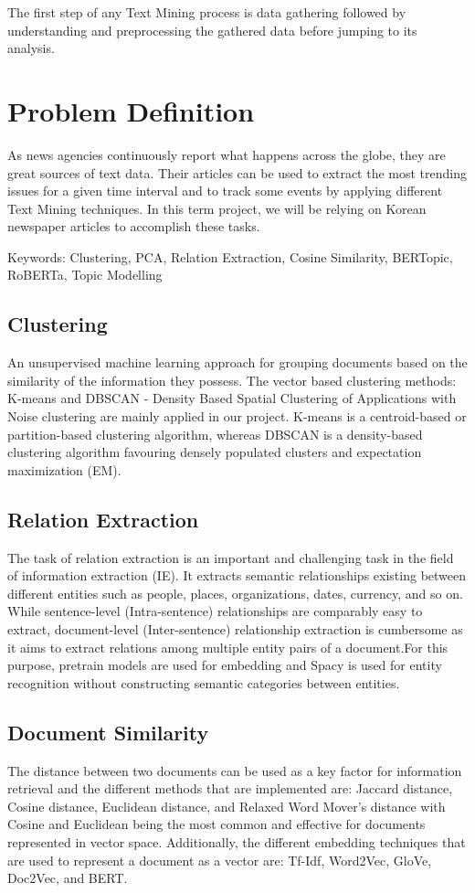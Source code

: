 \documentclass[sigconf,authorversion,nonacm]{acmart}
\begin{document}
The first step of any Text Mining process is data gathering followed by understanding and preprocessing the gathered data before jumping to its analysis.

\section{Problem Definition}
As news agencies continuously report what happens across the globe, they are great sources of text data. Their articles can be used to extract the most trending issues for a given time interval and to track some events by applying different Text Mining techniques. In this term project, we will be relying on Korean newspaper articles to accomplish these tasks.

Keywords: Clustering, PCA, Relation Extraction, Cosine Similarity, BERTopic, RoBERTa, Topic Modelling

\subsection{Clustering}
An unsupervised machine learning approach for grouping documents based on the similarity of the  information they possess. The vector based clustering methods: K-means and DBSCAN - Density Based Spatial Clustering of Applications with Noise clustering are mainly applied in our project. K-means is a centroid-based or partition-based clustering algorithm, whereas DBSCAN is a density-based clustering algorithm favouring densely populated clusters and expectation maximization (EM).

\subsection{Relation Extraction}
The task of relation extraction is an important and challenging task in the field of information extraction (IE). It extracts semantic relationships existing between different entities such as people, places, organizations, dates, currency, and so on. While sentence-level (Intra-sentence) relationships are comparably easy to extract, document-level (Inter-sentence) relationship extraction is cumbersome as it aims to extract relations among multiple entity pairs of a document.For this purpose, pretrain models are used for embedding and Spacy is used for entity recognition without constructing semantic categories between entities.

\subsection{Document Similarity}
The distance between two documents can be used as a key factor for information retrieval and the different methods that are implemented are: Jaccard distance, Cosine distance, Euclidean distance, and Relaxed Word Mover’s distance with Cosine and Euclidean being the most common and effective for documents represented in vector space. Additionally, the different embedding techniques that are used to represent a document as a vector are: Tf-Idf, Word2Vec, GloVe, Doc2Vec, and BERT.
\end{document}
